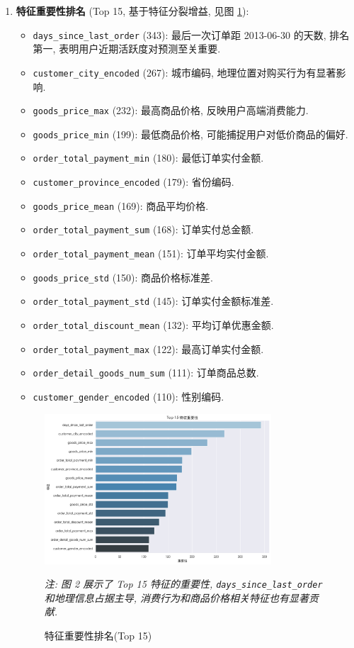 \documentclass[11pt, a4paper]{article}
\begin{document}
\begin{enumerate}
    \item \textbf{特征重要性排名} (Top 15, 基于特征分裂增益, 见图 \ref{fig:feature_importance}):
    \begin{itemize}
        \item \texttt{days\_since\_last\_order} (343): 最后一次订单距 2013-06-30 的天数, 排名第一, 表明用户近期活跃度对预测至关重要.
        \item \texttt{customer\_city\_encoded} (267): 城市编码, 地理位置对购买行为有显著影响.
        \item \texttt{goods\_price\_max} (232): 最高商品价格, 反映用户高端消费能力.
        \item \texttt{goods\_price\_min} (199): 最低商品价格, 可能捕捉用户对低价商品的偏好.
        \item \texttt{order\_total\_payment\_min} (180): 最低订单实付金额.
        \item \texttt{customer\_province\_encoded} (179): 省份编码.
        \item \texttt{goods\_price\_mean} (169): 商品平均价格.
        \item \texttt{order\_total\_payment\_sum} (168): 订单实付总金额.
        \item \texttt{order\_total\_payment\_mean} (151): 订单平均实付金额.
        \item \texttt{goods\_price\_std} (150): 商品价格标准差.
        \item \texttt{order\_total\_payment\_std} (145): 订单实付金额标准差.
        \item \texttt{order\_total\_discount\_mean} (132): 平均订单优惠金额.
        \item \texttt{order\_total\_payment\_max} (122): 最高订单实付金额.
        \item \texttt{order\_detail\_goods\_num\_sum} (111): 订单商品总数.
        \item \texttt{customer\_gender\_encoded} (110): 性别编码.
    \end{itemize}

    \begin{figure}[H]
        \centering
        \includegraphics[width=0.8\textwidth]{../analysis/feature_importance.png}
        \caption{特征重要性排名(Top 15)}
        \label{fig:feature_importance}
        \vspace{1em}
        \small
        \textit{注: 图 2 展示了 Top 15 特征的重要性, \texttt{days\_since\_last\_order} 和地理信息占据主导, 消费行为和商品价格相关特征也有显著贡献.}
    \end{figure}


\end{enumerate}
\end{document}
